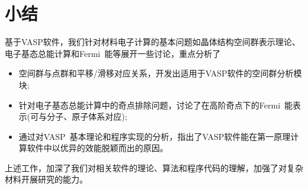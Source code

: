 \section{小结}
基于\textrm{VASP}软件，我们针对材料电子计算的基本问题如晶体结构空间群表示理论、电子基态总能计算和\textrm{Fermi~}能等展开一些讨论，重点分析了
\begin{itemize}
	\item 空间群与点群和平移/滑移对应关系，开发出适用于\textrm{VASP}软件的空间群分析模块;
	\item 针对电子基态总能计算中的奇点排除问题，讨论了在高阶奇点下的\textrm{Fermi~}能表示(可与分子、原子体系对应);~
	\item 通过对\textrm{VASP~}基本理论和程序实现的分析，指出了\textrm{VASP}软件能在第一原理计算软件中以优异的效能脱颖而出的原因。
\end{itemize}
上述工作，加深了我们对相关软件的理论、算法和程序代码的理解，加强了对复杂材料开展研究的能力。

